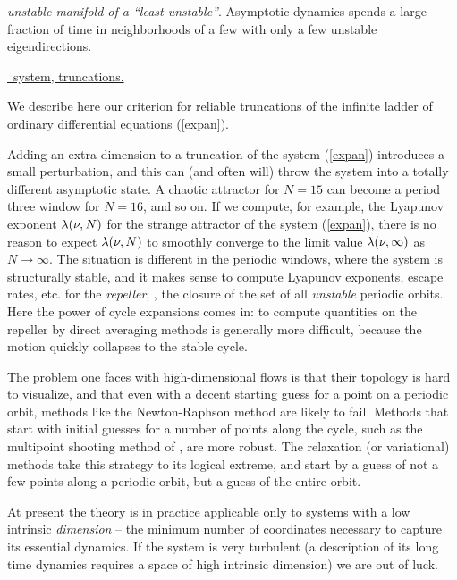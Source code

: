 {\em unstable manifold of a ``least unstable''{\eqv}}.
 Asymptotic dynamics
spends  a large fraction of time in
neighborhoods of a few  {\eqva} with
only a few unstable eigendirections.


\underline{\KS\ system, truncations.}{
We describe here our criterion for reliable
truncations of the infinite ladder of 
ordinary differential equations (\ref{expan}).

Adding an extra dimension to a truncation of the system (\ref{expan})
introduces a small
perturbation, and this can (and often will) 
throw the system into a totally different asymptotic state. 
A  chaotic attractor for $N=15$ can become a period three 
window for $N=16$, and so on. 
If we compute, for example, the Lyapunov exponent
$\lambda(\nu,N)$ for the strange attractor of the 
system (\ref{expan}), there is no reason to 
expect $\lambda(\nu,N)$ to smoothly converge to the limit  
value $\lambda(\nu,\infty)$ as $N \rightarrow \infty$. 
The situation is different in the periodic windows, 
where the system is structurally stable, and it makes sense to compute 
 Lyapunov exponents, escape rates, etc. for the 
{\em repeller}, \ie, the closure of the set of all 
{\em unstable} periodic orbits. 
Here the power of cycle expansions comes in: 
to compute quantities on the repeller by direct averaging methods is 
generally more difficult, because the motion quickly collapses to the 
stable cycle. 
	} %


The problem one faces with high-dimensional flows is 
that their topology is hard to
visualize, and that even with a decent starting guess for a point on
a periodic orbit, methods like the Newton-Raphson method are likely to fail.
Methods that start with initial guesses for a number of points along the
cycle, such as the multipoint shooting method of ,
are more robust.
The relaxation  (or variational) methods take this strategy to its
logical extreme,
and start by a guess of not a few points along a periodic orbit,
but a guess of the entire orbit.

At present the theory is in practice applicable only to systems
with a low intrinsic {\em dimension}
-- the minimum number of coordinates necessary to
capture its essential dynamics.
If the system is very turbulent
(a description of its long time dynamics requires a space of high
intrinsic dimension) we are out of luck. 

% 


